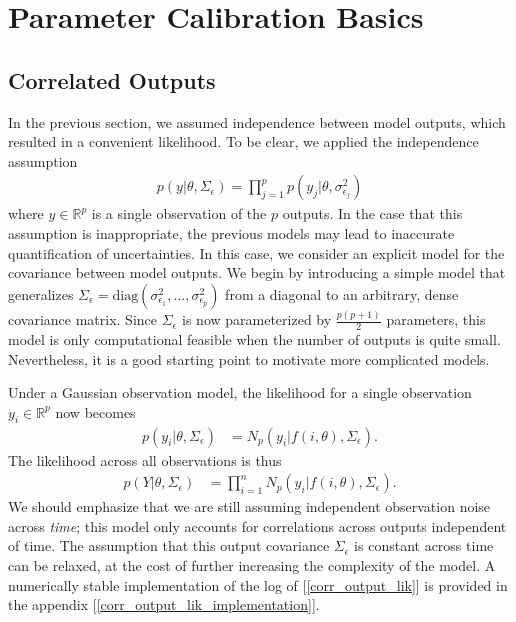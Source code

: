 \documentclass[12pt]{article}
\newcommand{\R}{\mathbb{R}}
\begin{document}
\section{Parameter Calibration Basics}
\subsection{Correlated Outputs}
In the previous section, we assumed independence between model outputs, which resulted in a convenient likelihood. To be clear, we applied the independence assumption
\begin{align}
p(y|\theta, \Sigma_\epsilon) = \prod_{j = 1}^{p} p(y_j|\theta, \sigma_{\epsilon_j}^2)
\end{align}
where $y \in \R^p$ is a single observation of the $p$ outputs. In the case that this assumption is inappropriate, the previous models may lead to inaccurate 
quantification of uncertainties. In this case, we consider an explicit model for the covariance between model outputs. We begin by introducing a simple model 
that generalizes $\Sigma_\epsilon = \text{diag}\left(\sigma_{\epsilon_1}^2, \dots, \sigma_{\epsilon_p}^2\right)$ from a diagonal to an arbitrary, dense covariance 
matrix. Since $\Sigma_\epsilon$ is now parameterized by $\frac{p(p+1)}{2}$ parameters, this model is only computational feasible when the number of outputs is 
quite small. Nevertheless, it is a good starting point to motivate more complicated models. 

Under a Gaussian observation model, the likelihood for a single observation $y_i \in \R^p$ now becomes 
\begin{align}
p(y_i|\theta, \Sigma_\epsilon) &= N_p(y_i|f(i, \theta), \Sigma_\epsilon).
\end{align}
The likelihood across all observations is thus
\begin{align}
p(Y|\theta, \Sigma_\epsilon) &= \prod_{i = 1}^{n} N_p(y_i|f(i, \theta), \Sigma_\epsilon). \label{corr_output_lik}
\end{align}
We should emphasize that we are still assuming independent observation noise across \textit{time}; this model only accounts for correlations across outputs 
independent of time. The assumption that this output covariance $\Sigma_\epsilon$ is constant across time can be relaxed, at the cost of further increasing the 
complexity of the model. A numerically stable implementation of the log of [\ref{corr_output_lik}] is provided in the appendix [\ref{corr_output_lik_implementation}].
\end{document}
